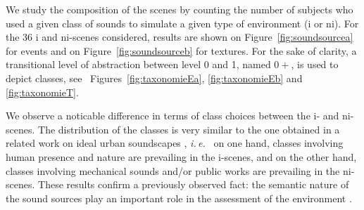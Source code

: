 \documentclass[12pt]{elsarticle}
\newcommand{\ie}{\emph{i.\,e.}}
\newcommand{\cf}{cf.}
\begin{document}

We study the composition of the scenes by counting the number of subjects who used a given class of sounds to simulate a given type of environment (i or ni). For the 36 i and ni-scenes considered, results are shown on Figure~\ref{fig:soundsourcea} for events and on Figure~\ref{fig:soundsourceb} for textures. For the sake of clarity, a transitional level of abstraction between level 0 and 1, named $0+$, is used to depict classes, see ~Figures~\ref{fig:taxonomieEa}, \ref{fig:taxonomieEb} and \ref{fig:taxonomieT}.


We observe a noticable difference in terms of class choices between the i- and ni-scenes. The distribution of the classes is very similar to the one obtained in a related work on ideal urban soundscapes \cite{guastavino2006ideal}, \ie~ on one hand, classes involving human presence and nature are prevailing in the i-scenes, and on the other hand, classes involving mechanical sounds and/or public works are prevailing in the ni-scenes. These results confirm a previously observed fact: the semantic nature of the sound sources play an important role in the assessment of the environment \cite{raimbault2005urban,dubois2006cognitive}.

\end{document}
